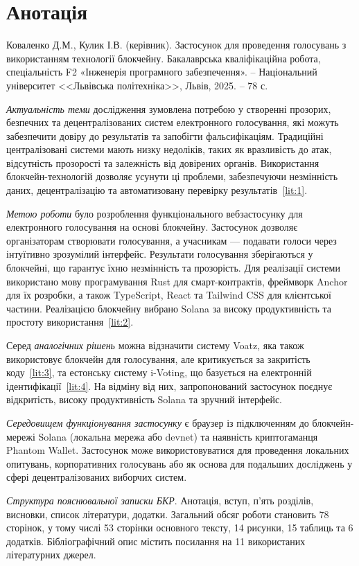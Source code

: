 \documentclass[14pt]{extreport}
\newcommand{\plainchap}[1]{
  \chapter*{#1}
}
\begin{document}
  \plainchap{Анотація}
  
  Коваленко Д.М., Кулик І.В. (керівник). Застосунок для проведення голосувань з використанням технології блокчейну. Бакалаврська кваліфікаційна робота, спеціальність F2 «Інженерія програмного забезпечення». -- Національний університет <<Львівська політехніка>>, Львів, 2025. -- 78 с.
  
  \textit{Актуальність теми} дослідження зумовлена потребою у створенні прозорих, безпечних та децентралізованих систем електронного голосування, які можуть забезпечити довіру до результатів та запобігти фальсифікаціям. Традиційні централізовані системи мають низку недоліків, таких як вразливість до атак, відсутність прозорості та залежність від довірених органів. Використання блокчейн-технологій дозволяє усунути ці проблеми, забезпечуючи незмінність даних, децентралізацію та автоматизовану перевірку результатів~\ref{lit:1}.

  \textit{Метою роботи} було розроблення функціонального вебзастосунку для електронного голосування на основі блокчейну. Застосунок дозволяє організаторам створювати голосування, а учасникам — подавати голоси через інтуїтивно зрозумілий інтерфейс. Результати голосування зберігаються у блокчейні, що гарантує їхню незмінність та прозорість. Для реалізації системи використано мову програмування Rust для смарт-контрактів, фреймворк Anchor для їх розробки, а також TypeScript, React та Tailwind CSS для клієнтської частини. Реалізацією блокчейну вибрано Solana за високу продуктивність та простоту використання~\ref{lit:2}.

  Серед \textit{аналогічних рішень} можна відзначити систему Voatz, яка також використовує блокчейн для голосування, але критикується за закритість коду~\ref{lit:3}, та естонську систему i-Voting, що базується на електронній ідентифікації~\ref{lit:4}. На відміну від них, запропонований застосунок поєднує відкритість, високу продуктивність Solana та зручний інтерфейс.

  \textit{Середовищем функціонування застосунку} є браузер із підключенням до блокчейн-мережі Solana (локальна мережа або devnet) та наявність криптогаманця Phantom Wallet. Застосунок може використовуватися для проведення локальних опитувань, корпоративних голосувань або як основа для подальших досліджень у сфері децентралізованих виборчих систем.

  \textit{Структура пояснювальної записки БКР}. Анотація, вступ, п’ять розділів, висновки, список літератури, додатки. Загальний обсяг роботи становить 78 сторінок, у тому числі 53 сторінки основного тексту, 14 рисунки, 15 таблиць та 6 додатків. Бібліографічний опис містить посилання на 11 використаних літературних джерел.
\end{document}
